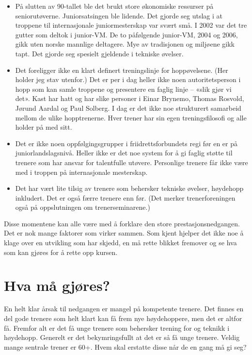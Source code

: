 \begin{itemize}
\item
  På slutten av 90-tallet ble det brukt store økonomiske ressurser på seniorutøverne. Juniorsatsingen ble lidende. Det gjorde seg utslag i at troppene til internasjonale juniormesterskap var svært små. I 2002 var det tre gutter som deltok i junior-VM. De to påfølgende junior-VM, 2004 og 2006, gikk uten norske mannlige deltagere. Mye av tradisjonen og miljøene gikk tapt. Det gjorde seg spesielt gjeldende i tekniske øvelser.
\item
  Det foreligger ikke en klart definert treningslinje for hoppøvelsene. (Her holder jeg stav utenfor.) Det er per i dag heller ikke noen autoritetsperson i hopp som kan samle troppene og presentere en faglig linje -- «slik gjør vi det». Kast har hatt og har slike personer i Einar Brynemo, Thomas Rosvold, Jørund Aardal og Paul Solberg. I dag er det ikke noe strukturert samarbeid mellom de ulike hopptrenerne. Hver trener har sin egen treningsfilosofi og alle holder på med sitt.
\item
  Det er ikke noen oppfølgingsgrupper i friidrettsforbundets regi før en er på juniorlandslagsnivå. Heller ikke er det noe system for å gi faglig støtte til trenere som har ansvar for talentfulle utøvere. Personlige trenere får ikke være med i troppen på internasjonale mesterskap.
\item
  Det har vært lite tilsig av trenere som behersker tekniske øvelser, høydehopp inkludert. Det er også færre trenere enn før. (Det merker trenerforeningen også på oppslutningen om trenerseminarene.)
\end{itemize}

Disse momentene kan alle være med å forklare den store prestasjonsnedgangen. Det er nok mange faktorer som virker sammen. Som kjent hjelper det ikke noe å klage over en utvikling som har skjedd, en må rette blikket fremover og se hva som kan gjøres for å rette opp kursen.

\section{Hva må gjøres?}\label{hva-muxe5-gjuxf8res}

En helt klar årsak til nedgangen er mangel på kompetente trenere. Det finnes en del gode trenere som helt klart kan få frem nye høydehoppere, men det er altfor få. Fremfor alt er det få unge trenere som behersker trening for og teknikk i høydehopp. Generelt er det bekymringsfullt at det er så få unge trenere. Veldig mange sentrale trener er 60+. Hvem skal erstatte disse når de en gang må gi seg?


